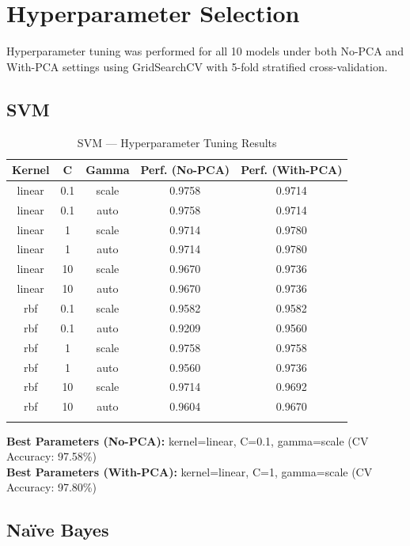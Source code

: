 \documentclass[12pt,a4paper]{article}
\begin{document}
\section{Hyperparameter Selection}

Hyperparameter tuning was performed for all 10 models under both No-PCA and With-PCA settings using GridSearchCV with 5-fold stratified cross-validation.

\subsection{SVM}

\begin{longtable}{|c|c|c|c|c|}
\hline
\textbf{Kernel} & \textbf{C} & \textbf{Gamma} & \textbf{Perf. (No-PCA)} & \textbf{Perf. (With-PCA)} \\ \hline
\endhead
linear & 0.1 & scale & 0.9758 & 0.9714 \\ \hline
linear & 0.1 & auto & 0.9758 & 0.9714 \\ \hline
linear & 1 & scale & 0.9714 & 0.9780 \\ \hline
linear & 1 & auto & 0.9714 & 0.9780 \\ \hline
linear & 10 & scale & 0.9670 & 0.9736 \\ \hline
linear & 10 & auto & 0.9670 & 0.9736 \\ \hline
rbf & 0.1 & scale & 0.9582 & 0.9582 \\ \hline
rbf & 0.1 & auto & 0.9209 & 0.9560 \\ \hline
rbf & 1 & scale & 0.9758 & 0.9758 \\ \hline
rbf & 1 & auto & 0.9560 & 0.9736 \\ \hline
rbf & 10 & scale & 0.9714 & 0.9692 \\ \hline
rbf & 10 & auto & 0.9604 & 0.9670 \\ \hline
\caption{SVM — Hyperparameter Tuning Results}
\label{tab:svm_tuning}
\end{longtable}

\textbf{Best Parameters (No-PCA):} kernel=linear, C=0.1, gamma=scale (CV Accuracy: 97.58\%)\\
\textbf{Best Parameters (With-PCA):} kernel=linear, C=1, gamma=scale (CV Accuracy: 97.80\%)

\subsection{Na\"ive Bayes}
\end{document}

